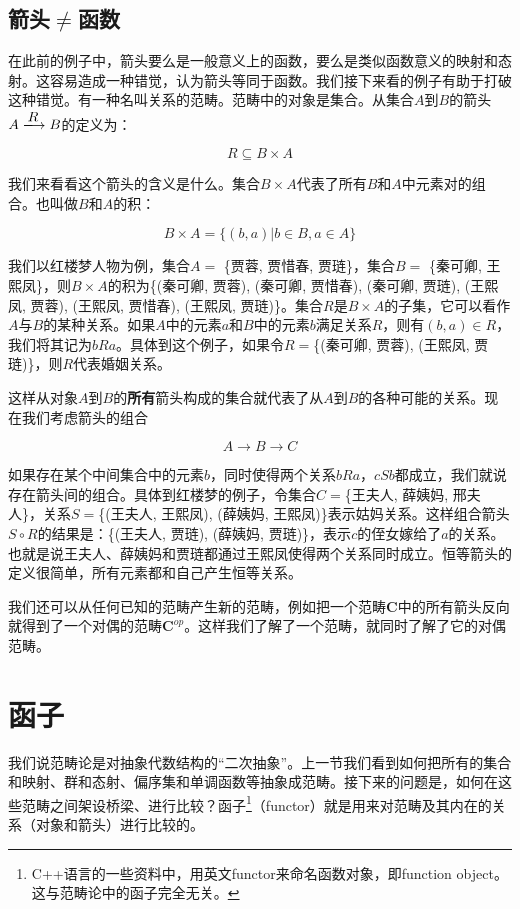 \documentclass[b5paper]{ctexart}
\begin{document}
\subsection{箭头\texorpdfstring{$\neq$}{≠}函数}

在此前的例子中，箭头要么是一般意义上的函数，要么是类似函数意义的映射和态射。这容易造成一种错觉，认为箭头等同于函数。我们接下来看的例子有助于打破这种错觉。有一种名叫关系的范畴。范畴中的对象是集合。从集合$A$到$B$的箭头$A \arrowto{R} B$的定义为：

\[
R \subseteq B \times A
\]

我们来看看这个箭头的含义是什么。集合$B \times A$代表了所有$B$和$A$中元素对的组合。也叫做$B$和$A$的积：

\[
B \times A = \{(b, a) | b \in B, a \in A\}
\]

我们以红楼梦人物为例，集合$A =$ \{贾蓉, 贾惜春, 贾琏\}，集合$B =$ \{秦可卿, 王熙凤\}，则$B \times A$的积为\{(秦可卿, 贾蓉), (秦可卿, 贾惜春), (秦可卿, 贾琏), (王熙凤, 贾蓉), (王熙凤, 贾惜春), (王熙凤, 贾琏)\}。集合$R$是$B \times A$的子集，它可以看作$A$与$B$的某种关系。如果$A$中的元素$a$和$B$中的元素$b$满足关系$R$，则有$(b, a) \in R$，我们将其记为$bRa$。具体到这个例子，如果令$R=$\{(秦可卿, 贾蓉), (王熙凤, 贾琏)\}，则$R$代表婚姻关系。

这样从对象$A$到$B$的\textbf{所有}箭头构成的集合就代表了从$A$到$B$的各种可能的关系。现在我们考虑箭头的组合

\[
A \to B \to C
\]

如果存在某个中间集合中的元素$b$，同时使得两个关系$bRa$，$cSb$都成立，我们就说存在箭头间的组合。具体到红楼梦的例子，令集合$C=$\{王夫人, 薛姨妈, 邢夫人\}，关系$S=$\{(王夫人, 王熙凤), (薛姨妈, 王熙凤)\}表示姑妈关系。这样组合箭头$S \circ R$的结果是：\{(王夫人, 贾琏), (薛姨妈, 贾琏)\}，表示$c$的侄女嫁给了$a$的关系。也就是说王夫人、薛姨妈和贾琏都通过王熙凤使得两个关系同时成立。恒等箭头的定义很简单，所有元素都和自己产生恒等关系。

我们还可以从任何已知的范畴产生新的范畴，例如把一个范畴$\pmb{C}$中的所有箭头反向就得到了一个对偶的范畴$\pmb{C}^{op}$。这样我们了解了一个范畴，就同时了解了它的对偶范畴。

\section{函子}
我们说范畴论是对抽象代数结构的“二次抽象”。上一节我们看到如何把所有的集合和映射、群和态射、偏序集和单调函数等抽象成范畴。接下来的问题是，如何在这些范畴之间架设桥梁、进行比较？函子\footnote{C++语言的一些资料中，用英文functor来命名函数对象，即function object。这与范畴论中的函子完全无关。}（functor）就是用来对范畴及其内在的关系（对象和箭头）进行比较的。
\end{document}
